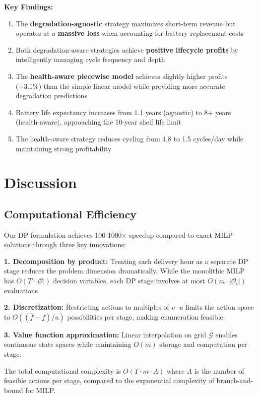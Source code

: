 \documentclass[10pt,twocolumn]{article}
\begin{document}
\textbf{Key Findings:}
\begin{enumerate}
\item The \textbf{degradation-agnostic} strategy maximizes short-term revenue but operates at a \textbf{massive loss} when accounting for battery replacement costs
\item Both degradation-aware strategies achieve \textbf{positive lifecycle profits} by intelligently managing cycle frequency and depth
\item The \textbf{health-aware piecewise model} achieves slightly higher profits (+3.1\%) than the simple linear model while providing more accurate degradation predictions
\item Battery life expectancy increases from 1.1 years (agnostic) to 8+ years (health-aware), approaching the 10-year shelf life limit
\item The health-aware strategy reduces cycling from 4.8 to 1.5 cycles/day while maintaining strong profitability
\end{enumerate}

\section{Discussion}
\subsection{Computational Efficiency}
Our DP formulation achieves 100-1000× speedup compared to exact MILP solutions through three key innovations:

\textbf{1. Decomposition by product:} Treating each delivery hour as a separate DP stage reduces the problem dimension dramatically. While the monolithic MILP has $O(T \cdot |\mathcal{O}|)$ decision variables, each DP stage involves at most $O(m \cdot |\mathcal{O}_t|)$ evaluations.

\textbf{2. Discretization:} Restricting actions to multiples of $v \cdot u$ limits the action space to $O((\bar{f} - \underline{f})/u)$ possibilities per stage, making enumeration feasible.

\textbf{3. Value function approximation:} Linear interpolation on grid $\mathcal{G}$ enables continuous state spaces while maintaining $O(m)$ storage and computation per stage.

The total computational complexity is $O(T \cdot m \cdot A)$ where $A$ is the number of feasible actions per stage, compared to the exponential complexity of branch-and-bound for MILP.
\end{document}
